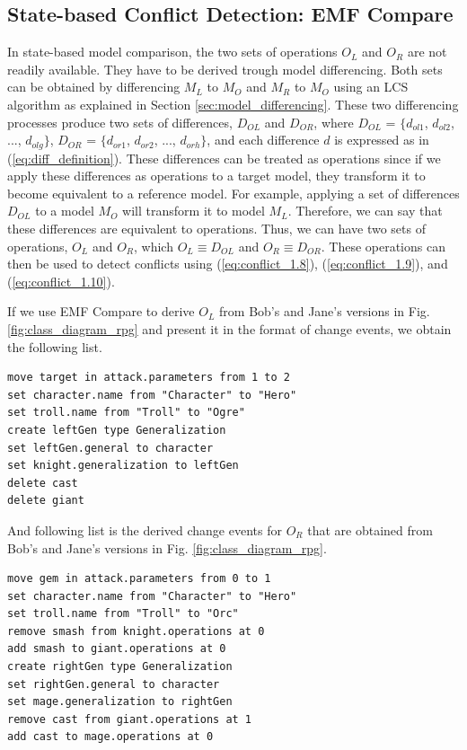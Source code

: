 \subsection{State-based Conflict Detection: EMF Compare}
\label{sec:state_based_conflict_detection_emf_compare}
In state-based model comparison, the two sets of operations $O_{L}$ and $O_{R}$ are not readily available. They have to be derived trough model differencing. Both sets can be obtained by differencing $M_{L}$ to $M_{O}$ and $M_{R}$ to $M_{O}$ using an LCS algorithm as explained in Section \ref{sec:model_differencing}. These two differencing processes produce two sets of differences, $D_{OL}$ and $D_{OR}$, where $D_{OL}$ = $\{d_{ol1}$, $d_{ol2}$, ..., $d_{olg}\}$, $D_{OR}$ = $\{d_{or1}$, $d_{or2}$, ..., $d_{orh}\}$, and each difference $d$ is expressed as in (\ref{eq:diff_definition}). These differences can be treated as operations since if we apply these differences as operations to a target model, they transform it to become equivalent to a reference model. For example, applying a set of differences $D_{OL}$ to a model $M_{O}$ will transform it to model $M_{L}$. Therefore, we can say that these differences are equivalent to operations. Thus, we can have two sets of operations, $O_{L}$ and $O_{R}$, which $O_{L} \equiv D_{OL}$ and $O_{R} \equiv D_{OR}$. These operations can then be used to detect conflicts using (\ref{eq:conflict_1.8}), (\ref{eq:conflict_1.9}), and (\ref{eq:conflict_1.10}).  

If we use EMF Compare to derive $O_{L}$ from Bob's and Jane's versions in Fig. \ref{fig:class_diagram_rpg} and present it in the format of change events, we obtain the following list. 
\begin{lstlisting}[firstnumber=1,style=eol,caption={The derived change events (operations) made by Bob to produce the right model in Fig. \ref{fig:class_diagram_left} (right version).},label=lst:cbp_left_state]
move target in attack.parameters from 1 to 2
set character.name from "Character" to "Hero"
set troll.name from "Troll" to "Ogre"
create leftGen type Generalization
set leftGen.general to character
set knight.generalization to leftGen
delete cast
delete giant
\end{lstlisting}

And following list is the derived change events for $O_{R}$ that are obtained from Bob's and Jane's versions in Fig. \ref{fig:class_diagram_rpg}. 
\begin{lstlisting}[firstnumber=1,style=eol,caption={The derived change events (operations) made by Alice to produce the right model in Fig. \ref{fig:class_diagram_right} (right version).},label=lst:cbp_right_state]
move gem in attack.parameters from 0 to 1
set character.name from "Character" to "Hero"
set troll.name from "Troll" to "Orc"
remove smash from knight.operations at 0
add smash to giant.operations at 0
create rightGen type Generalization
set rightGen.general to character
set mage.generalization to rightGen
remove cast from giant.operations at 1
add cast to mage.operations at 0
\end{lstlisting}

